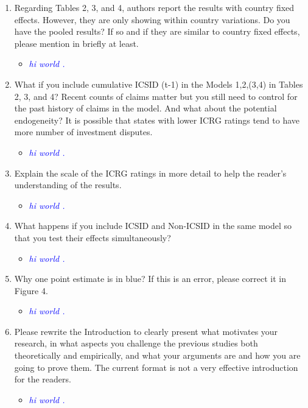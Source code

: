 \begin{enumerate}
\begin{itemize}
	\end{itemize}
	\item Regarding Tables 2, 3, and 4, authors report the results with country fixed effects. However, they are only showing within country variations. Do you have the pooled results? If so and if they are similar to country fixed effects, please mention in briefly at least.
	\begin{itemize}
		\item \textcolor{blue}{ \emph{ hi world . }}
	\end{itemize}
	\item What if you include cumulative ICSID (t-1) in the Models 1,2,(3,4) in Tables 2, 3, and 4? Recent counts of claims matter but you still need to control for the past history of claims in the model. And what about the potential endogeneity? It is possible that states with lower ICRG ratings tend to have more number of investment disputes.		
	\begin{itemize}
		\item \textcolor{blue}{ \emph{ hi world . }}
	\end{itemize}
	\item Explain the scale of the ICRG ratings in more detail to help the reader’s understanding of the results.	
	\begin{itemize}
		\item \textcolor{blue}{ \emph{ hi world . }}
	\end{itemize}
	\item What happens if you include ICSID and Non-ICSID in the same model so that you test their effects simultaneously?		
	\begin{itemize}
		\item \textcolor{blue}{ \emph{ hi world . }}
	\end{itemize}
	\item Why one point estimate is in blue? If this is an error, please correct it in Figure 4.	
	\begin{itemize}
		\item \textcolor{blue}{ \emph{ hi world . }}
	\end{itemize}
	\item Please rewrite the Introduction to clearly present what motivates your research, in what aspects you challenge the previous studies both theoretically and empirically, and what your arguments are and how you are going to prove them. The current format is not a very effective introduction for the readers.
	\begin{itemize}
		\item \textcolor{blue}{ \emph{ hi world . }}
	\end{itemize}	
\end{enumerate}